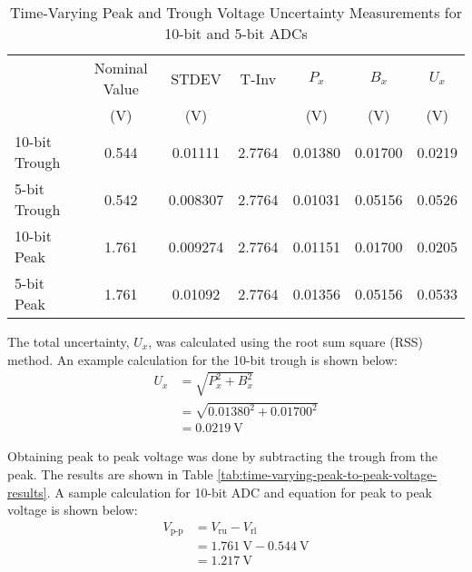\begin{table}[h]
   \centering
   \caption{Time-Varying Peak and Trough Voltage Uncertainty Measurements for 10-bit and 5-bit ADCs}
   \label{tab:time-varying-peak-to-peak-voltage-uncertainty-measurements}
   \begin{tabular}{lcccccc}
      \toprule
      & Nominal Value & STDEV & T-Inv & $P_x$ & $B_x$ & $U_x$ \\
      & (V)           & (V)                &       & (V)   & (V)   & (V)   \\
      \midrule
      10-bit Trough & 0.544 & 0.01111 & 2.7764 & 0.01380 & 0.01700 & 0.0219 \\
      5-bit Trough  & 0.542 & 0.008307 & 2.7764 & 0.01031 & 0.05156 & 0.0526 \\
      10-bit Peak   & 1.761 & 0.009274 & 2.7764 & 0.01151 & 0.01700 & 0.0205 \\
      5-bit Peak    & 1.761 & 0.01092 & 2.7764 & 0.01356 & 0.05156 & 0.0533 \\
      \bottomrule
   \end{tabular}
\end{table}
\FloatBarrier
\noindent The total uncertainty, $U_x$, was calculated using the root sum square (RSS) method. An example calculation for the 10-bit trough is shown below:
\[
   \begin{aligned}
      U_x &= \sqrt{P_x^2 + B_x^2} \\
            &= \sqrt{0.01380^2 + 0.01700^2} \\
            &= \boxed{\qty{0.0219}{\volt}}
   \end{aligned}
\]

\noindent Obtaining peak to peak voltage was done by subtracting the trough from the peak. The results are shown in Table \ref{tab:time-varying-peak-to-peak-voltage-results}. 
A sample calculation for 10-bit ADC and equation for peak to peak voltage is shown below:
\[
\begin{aligned}
   V_{\text{p-p}} &= V_{\text{ru}} - V_{\text{rl}} \\
                  &= \qty{1.761}{\volt} - \qty{0.544}{\volt} \\
                  &= \boxed{\qty{1.217}{\volt}}
\end{aligned}
\]

